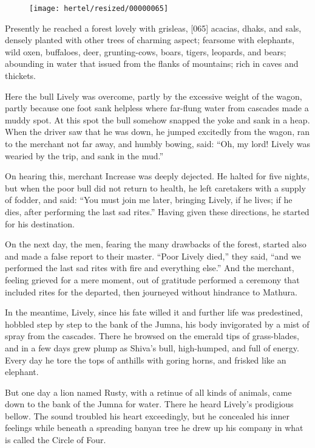 \documentclass[article, twoside, 10pt]{memoir}
\begin{document}
\begin{figure}[p]\texttt{[image: hertel/resized/00000065]}\end{figure}Presently he reached a forest lovely with grisleas, [065] acacias,
dhaks, and sals, densely planted with other trees of charming
aspect; fearsome with elephants, wild oxen, buffaloes, deer,
grunting-cows, boars, tigers, leopards, and bears; abounding in
water that issued from the flanks of mountains; rich in caves and
thickets.

Here the bull Lively was overcome, partly by the excessive weight
of the wagon, partly because one foot sank helpless where far-flung
water from cascades made a muddy spot. At this spot the bull
somehow snapped the yoke and sank in a heap. When the driver saw
that he was down, he jumped excitedly from the wagon, ran to the
merchant not far away, and humbly bowing, said:
``Oh, my lord! Lively was wearied by the trip, and sank in the mud.''

On hearing this, merchant Increase was deeply dejected. He halted
for five nights, but when the poor bull did not return to health,
he left caretakers with a supply of fodder, and said:
``You must join me later, bringing Lively, if he lives; if he dies, after performing the last sad rites.''
Having given these directions, he started for his destination.

On the next day, the men, fearing the many drawbacks of the forest,
started also and made a false report to their master.
``Poor Lively died,'' they said,
``and we performed the last sad rites with fire and everything else.''
And the merchant, feeling grieved for a mere moment, out of
gratitude performed a ceremony that included rites for the
departed, then journeyed without hindrance to Mathura.

In the meantime, Lively, since his fate willed it and further life
was predestined, hobbled step by step to the bank of the Jumna, his
body invigorated by a mist of spray from the cascades. There he
browsed on the emerald tips of grass-blades, and in a few days grew
plump as Shiva's bull, high-humped, and full of energy. Every day
he tore the tops of anthills with goring horns, and frisked like an
elephant.

But one day a lion named Rusty, with a retinue of all kinds of
animals, came down to the bank of the Jumna for water. There he
heard Lively's prodigious bellow. The sound troubled his heart
exceedingly, but he concealed his inner feelings while beneath a
spreading banyan tree he drew up his company in what is called the
Circle of Four.
\end{document}
